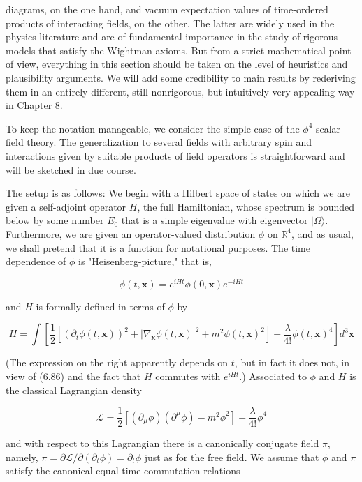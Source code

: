 \documentclass[10pt, letterpaper]{article}
\begin{document}
diagrams, on the one hand, and vacuum expectation values of time-ordered products of interacting fields, on the other. The latter are widely used in the physics literature and are of fundamental importance in the study of rigorous models that satisfy the Wightman axioms. But from a strict mathematical point of view, everything in this section should be taken on the level of heuristics and plausibility arguments. We will add some credibility to main results by rederiving them in an entirely different, still nonrigorous, but intuitively very appealing way in Chapter 8.

To keep the notation manageable, we consider the simple case of the $\phi^{4}$ scalar field theory. The generalization to several fields with arbitrary spin and interactions given by suitable products of field operators is straightforward and will be sketched in due course.

The setup is as follows: We begin with a Hilbert space of states on which we are given a self-adjoint operator $H$, the full Hamiltonian, whose spectrum is bounded below by some number $E_{0}$ that is a simple eigenvalue with eigenvector $|\Omega\rangle$. Furthermore, we are given an operator-valued distribution $\phi$ on $\mathbb{R}^{4}$, and as usual, we shall pretend that it is a function for notational purposes. The time dependence of $\phi$ is "Heisenberg-picture," that is,

$$
\phi(t, \mathbf{x})=e^{i H t} \phi(0, \mathbf{x}) e^{-i H t}
$$

and $H$ is formally defined in terms of $\phi$ by

$$
H=\int\left[\frac{1}{2}\left[\left(\partial_{t} \phi(t, \mathbf{x})\right)^{2}+\left|\nabla_{\mathbf{x}} \phi(t, \mathbf{x})\right|^{2}+m^{2} \phi(t, \mathbf{x})^{2}\right]+\frac{\lambda}{4!} \phi(t, \mathbf{x})^{4}\right] d^{3} \mathbf{x}
$$

(The expression on the right apparently depends on $t$, but in fact it does not, in view of (6.86) and the fact that $H$ commutes with $e^{i H t}$.) Associated to $\phi$ and $H$ is the classical Lagrangian density

$$
\mathcal{L}=\frac{1}{2}\left[\left(\partial_{\mu} \phi\right)\left(\partial^{\mu} \phi\right)-m^{2} \phi^{2}\right]-\frac{\lambda}{4!} \phi^{4}
$$

and with respect to this Lagrangian there is a canonically conjugate field $\pi$, namely, $\pi=\partial \mathcal{L} / \partial\left(\partial_{t} \phi\right)=\partial_{t} \phi$ just as for the free field. We assume that $\phi$ and $\pi$ satisfy the canonical equal-time commutation relations
\end{document}
